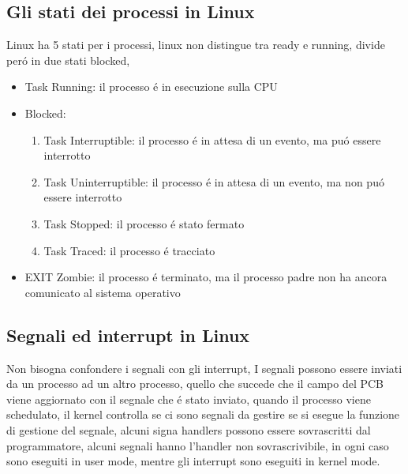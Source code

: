 \documentclass[11pt]{article}
\begin{document}
\subsection{Gli stati dei processi in Linux}
Linux ha 5 stati per i processi, linux non distingue tra ready e running, divide peró in due stati blocked,
\begin{itemize}
    \item Task Running: il processo é in esecuzione sulla CPU
    \item Blocked:
    \begin{enumerate}
        \item Task Interruptible: il processo é in attesa di un evento, ma puó essere interrotto
        \item Task Uninterruptible: il processo é in attesa di un evento, ma non puó essere interrotto
        \item Task Stopped: il processo é stato fermato
        \item Task Traced: il processo é tracciato
    \end{enumerate}
    \item EXIT Zombie: il processo é terminato, ma il processo padre non ha ancora comunicato al sistema operativo
    \end{itemize}
\subsection{Segnali ed interrupt in Linux}
Non bisogna confondere i segnali con gli interrupt, I segnali possono essere inviati da un processo ad un altro processo,
quello che succede che il campo del PCB viene aggiornato con il segnale che é stato inviato, quando il processo
viene schedulato, il kernel controlla se ci sono segnali da gestire se si esegue la funzione di gestione del segnale,
alcuni signa handlers possono essere sovrascritti dal programmatore, alcuni segnali hanno l'handler non sovrascrivibile,
in ogni caso sono eseguiti in user mode, mentre gli interrupt sono eseguiti in kernel mode.
\end{document}
